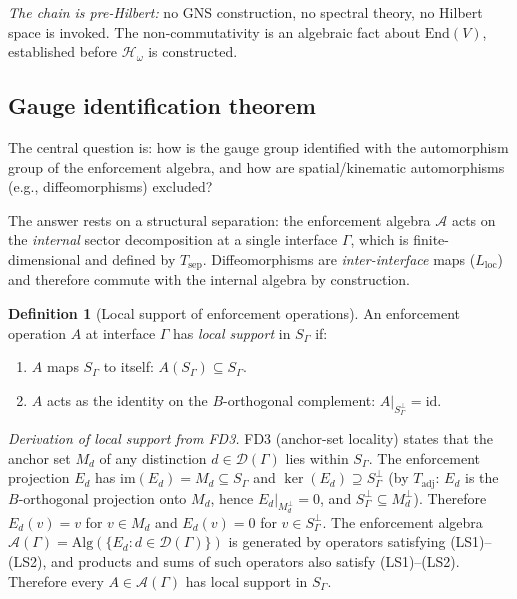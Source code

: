\documentclass[11pt,a4paper]{article}
\theoremstyle{definition}
\newtheorem{definition}[theorem]{Definition}
\newcommand{\End}{\mathrm{End}}
\begin{document}
\smallskip\noindent\textit{The chain is pre-Hilbert:} no GNS
construction, no spectral theory, no Hilbert space is invoked.
The non-commutativity is an algebraic fact about $\End(V)$,
established before $\mathcal{H}_\omega$ is constructed.


\subsection{Gauge identification theorem}
\label{sec:gauge_ident}

The central question is: how is the gauge group identified with the
automorphism group of the enforcement algebra, and how are
spatial/kinematic automorphisms (e.g., diffeomorphisms) excluded?

The answer rests on a structural separation: the enforcement algebra
$\mathcal{A}$ acts on the \emph{internal} sector decomposition at a
single interface $\Gamma$, which is finite-dimensional and defined by
$T_{\mathrm{sep}}$.  Diffeomorphisms are \emph{inter-interface} maps
($L_{\mathrm{loc}}$) and therefore commute with the internal algebra
by construction.

\begin{definition}[Local support of enforcement operations]\label{def:local_support}
An enforcement operation $A$ at interface $\Gamma$ has \emph{local
support} in $S_\Gamma$ if:
\begin{enumerate}[label=(LS\arabic*),nosep]
  \item $A$ maps $S_\Gamma$ to itself: $A(S_\Gamma) \subseteq S_\Gamma$.
  \item $A$ acts as the identity on the $B$-orthogonal complement:
  $A|_{S_\Gamma^\perp} = \mathrm{id}$.
\end{enumerate}
\end{definition}

\noindent\textit{Derivation of local support from FD3.}\quad
FD3 (anchor-set locality) states that the anchor set $M_d$ of any
distinction $d \in \mathcal{D}(\Gamma)$ lies within $S_\Gamma$.
The enforcement projection $E_d$ has $\mathrm{im}(E_d) = M_d
\subseteq S_\Gamma$ and $\ker(E_d) \supseteq S_\Gamma^\perp$ (by
$T_{\mathrm{adj}}$: $E_d$ is the $B$-orthogonal projection onto $M_d$,
hence $E_d|_{M_d^\perp} = 0$, and $S_\Gamma^\perp \subseteq M_d^\perp$).
Therefore $E_d(v) = v$ for $v \in M_d$ and $E_d(v) = 0$ for
$v \in S_\Gamma^\perp$.  The enforcement algebra
$\mathcal{A}(\Gamma) = \mathrm{Alg}(\{E_d : d \in \mathcal{D}(\Gamma)\})$
is generated by operators satisfying (LS1)--(LS2), and products and sums
of such operators also satisfy (LS1)--(LS2).  Therefore every
$A \in \mathcal{A}(\Gamma)$ has local support in $S_\Gamma$.
\end{document}
